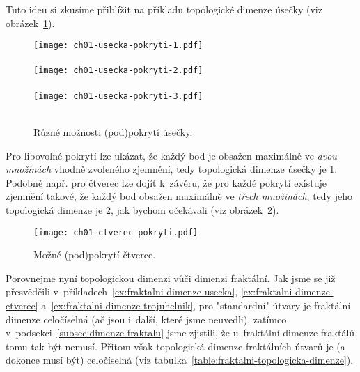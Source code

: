 
Tuto ideu si zkusíme přiblížit na příkladu topologické dimenze úsečky (viz obrázek~\ref{fig:usecka-zjemneni}).
\begin{figure}[h]
    \centering
    \texttt{[image: ch01-usecka-pokryti-1.pdf]}\\\qquad\\
    \texttt{[image: ch01-usecka-pokryti-2.pdf]}\\\qquad\\
    \texttt{[image: ch01-usecka-pokryti-3.pdf]}\\\qquad\\
    \caption{Různé možnosti (pod)pokrytí úsečky.}
    \label{fig:usecka-zjemneni}
\end{figure}
Pro libovolné pokrytí lze ukázat, že každý bod je obsažen maximálně ve \emph{dvou množinách} vhodně zvoleného zjemnění, tedy topologická dimenze úsečky je $1$. Podobně např. pro čtverec lze dojít k~závěru, že pro každé pokrytí existuje zjemnění takové, že každý bod obsažen maximálně ve \emph{třech množinách}, tedy jeho topologická dimenze je 2, jak bychom očekávali (viz obrázek~\ref{fig:ctverec-zjemneni}).
\begin{figure}[h]
    \centering
    \texttt{[image: ch01-ctverec-pokryti.pdf]}
    \caption{Možné (pod)pokrytí čtverce.}
    \label{fig:ctverec-zjemneni}
\end{figure}
Porovnejme nyní topologickou dimenzi vůči dimenzi fraktální. Jak jsme se již přesvědčili v~příkladech~\ref{ex:fraktalni-dimenze-usecka}, \ref{ex:fraktalni-dimenze-ctverec} a~\ref{ex:fraktalni-dimenze-trojuhelnik}, pro "standardní" útvary je fraktální dimenze celočíselná (ač jsou i~další, které jsme neuvedli), zatímco v~podsekci~\ref{subsec:dimenze-fraktalu} jsme zjistili, že u~fraktální dimenze fraktálů tomu tak být nemusí. Přitom však topologická dimenze fraktálních útvarů je (a dokonce musí být) celočíselná (viz tabulka~\ref{table:fraktalni-topologicka-dimenze}).
